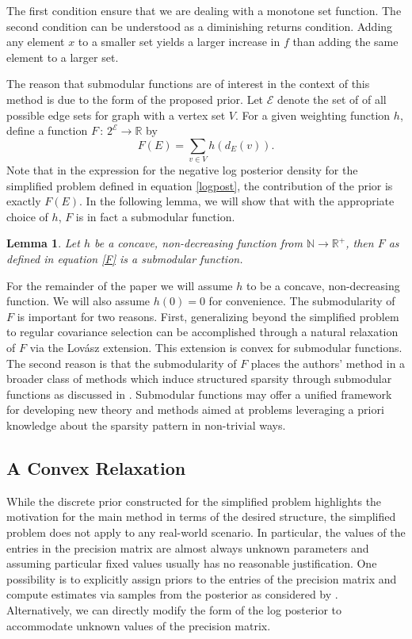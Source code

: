\documentclass{uwstat572}
\newtheorem{lemma}[theorem]{Lemma}
\theoremstyle{remark}
\theoremstyle{definition}
\begin{document}
The first condition ensure that we are dealing with a monotone set function. The second condition can be understood as a diminishing returns condition.  Adding any element $x$ to a smaller set yields a larger increase in $f$ than adding the same element to a larger set.  

The reason that submodular functions are of interest in the context of this method is due to the form of the proposed prior.  Let $\mathcal{E}$ denote the set of of all possible edge sets for graph with a vertex set $V$.  For a given weighting function $h$, define a function $F \, : \, 2^{\mathcal{E}} \to \mathbb{R}$ by
\begin{equation}\label{F}
F(E) = \sum_{v \in V} h(d_E(v)).
\end{equation}
Note that in the expression for the  negative log posterior density for the simplified problem defined in equation \eqref{logpost}, the contribution of the prior is exactly $ F(E)$.  In the following lemma, we will show that with the appropriate choice of $h$, $F$ is in fact a submodular function.

\begin{lemma}
Let $h$ be a concave, non-decreasing function from $\mathbb{N} \to \mathbb{R}^+$, then $F$ as defined in equation \eqref{F} is a submodular function.
\end{lemma}
For the remainder of the paper we will assume $h$ to be a concave, non-decreasing function.  We will also assume $h(0) = 0$ for convenience.  The submodularity of $F$ is important for two reasons.  First, generalizing beyond the simplified problem to regular covariance selection can be accomplished through a natural relaxation of $F$ via the Lov{\'a}sz extension.  This extension is convex for submodular functions.  The second reason is that the submodularity of $F$ places the authors' method in a broader class of methods which induce structured sparsity through submodular functions as discussed in \citep{bach2010}. Submodular functions may offer a unified framework for developing new theory and methods aimed at problems leveraging a priori knowledge about the sparsity pattern in non-trivial ways.



\subsection{A Convex Relaxation}

While the discrete prior constructed for the simplified problem highlights the motivation for the main method in terms of the desired structure, the simplified problem does not apply to any real-world scenario.  In particular, the values of the entries in the precision matrix are almost always unknown parameters and assuming particular fixed values usually has no reasonable justification.  One possibility is to explicitly assign priors to the entries of the precision matrix and compute estimates via samples from the posterior as considered by \cite{sheridan2010}.  Alternatively, we can directly modify the form of the log posterior to accommodate unknown values of the precision matrix.  
\end{document}
